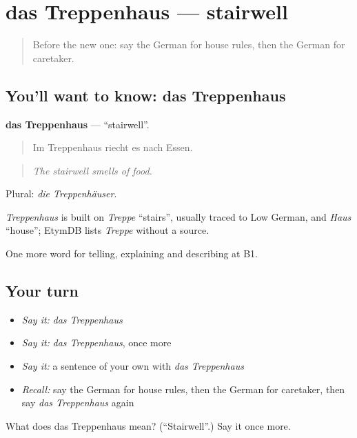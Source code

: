 \section[das Treppenhaus]{das Treppenhaus — stairwell}

\label{lesson:GE-C532-treppenhaus}



\begin{quote}
Before the new one: say the German for house rules, then the German for caretaker.
\end{quote}

\subsection*{You'll want to know: das Treppenhaus}
\textbf{das Treppenhaus} — \textquotedblleft{}stairwell\textquotedblright{}.

\begin{quote}
Im Treppenhaus riecht es nach Essen.
\end{quote}

\begin{quote}
\emph{The stairwell smells of food.}
\end{quote}

Plural: \emph{die Treppenhäuser}.

\begin{cousinweb}
\emph{Treppenhaus} is built on \emph{Treppe} \textquotedblleft{}stairs\textquotedblright{}, usually traced to Low German, and \emph{Haus} \textquotedblleft{}house\textquotedblright{}; EtymDB lists \emph{Treppe} without a source.
\end{cousinweb}

\begin{grammarlens}[title={What you've built}]
One more word for telling, explaining and describing at B1.
\end{grammarlens}

\subsection*{Your turn}
\begin{itemize}
\raggedright
  \item \emph{Say it:} \emph{das Treppenhaus}
  \item \emph{Say it:} \emph{das Treppenhaus}, once more
  \item \emph{Say it:} a sentence of your own with \emph{das Treppenhaus}
  \item \emph{Recall:} say the German for house rules, then the German for caretaker, then say \emph{das Treppenhaus} again
\end{itemize}

\begin{tcolorbox}[breakable,colback=teal!4,colframe=teal!35!black,title={Before you move on}]
What does das Treppenhaus mean? (\textquotedblleft{}Stairwell\textquotedblright{}.) Say it once more.
\end{tcolorbox}
